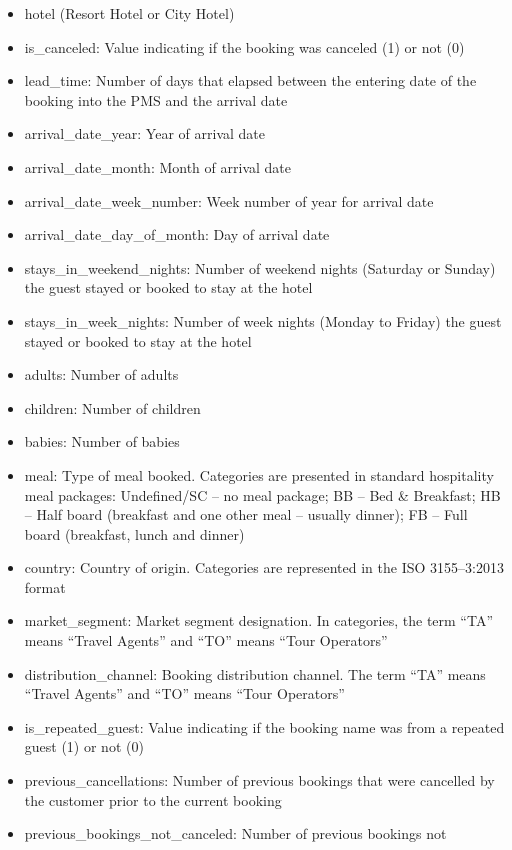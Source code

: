 \documentclass[11pt]{article}
\providecommand{\tightlist}{%
      \setlength{\itemsep}{0pt}\setlength{\parskip}{0pt}}
\begin{document}
    \begin{itemize}
\tightlist
\item
  hotel (Resort Hotel or City Hotel)
\item
  is\_canceled: Value indicating if the booking was canceled (1) or not
  (0)
\item
  lead\_time: Number of days that elapsed between the entering date of
  the booking into the PMS and the arrival date
\item
  arrival\_date\_year: Year of arrival date
\item
  arrival\_date\_month: Month of arrival date
\item
  arrival\_date\_week\_number: Week number of year for arrival date
\item
  arrival\_date\_day\_of\_month: Day of arrival date
\item
  stays\_in\_weekend\_nights: Number of weekend nights (Saturday or
  Sunday) the guest stayed or booked to stay at the hotel
\item
  stays\_in\_week\_nights: Number of week nights (Monday to Friday) the
  guest stayed or booked to stay at the hotel
\item
  adults: Number of adults
\item
  children: Number of children
\item
  babies: Number of babies
\item
  meal: Type of meal booked. Categories are presented in standard
  hospitality meal packages: Undefined/SC -- no meal package; BB -- Bed
  \& Breakfast; HB -- Half board (breakfast and one other meal --
  usually dinner); FB -- Full board (breakfast, lunch and dinner)
\item
  country: Country of origin. Categories are represented in the ISO
  3155--3:2013 format
\item
  market\_segment: Market segment designation. In categories, the term
  ``TA'' means ``Travel Agents'' and ``TO'' means ``Tour Operators''
\item
  distribution\_channel: Booking distribution channel. The term ``TA''
  means ``Travel Agents'' and ``TO'' means ``Tour Operators''
\item
  is\_repeated\_guest: Value indicating if the booking name was from a
  repeated guest (1) or not (0)
\item
  previous\_cancellations: Number of previous bookings that were
  cancelled by the customer prior to the current booking
\item
  previous\_bookings\_not\_canceled: Number of previous bookings not

\end{itemize}
\end{document}
